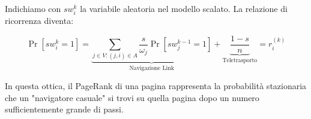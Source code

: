 Indichiamo con $sw_i^k$ la variabile aleatoria nel modello scalato. La relazione di ricorrenza diventa:

\[
\Pr\left[sw_i^k = 1\right] = \underbrace{\sum_{j \in V: (j,i) \in A} \frac{s}{\omega_j} \Pr\left[sw_j^{k-1} = 1\right]}_{\text{Navigazione Link}} + \underbrace{\frac{1-s}{n}}_{\text{Teletrasporto}} = r_i^{(k)}
\]

In questa ottica, il PageRank di una pagina rappresenta la probabilità stazionaria che un "navigatore casuale" si trovi su quella pagina dopo un numero sufficientemente grande di passi.